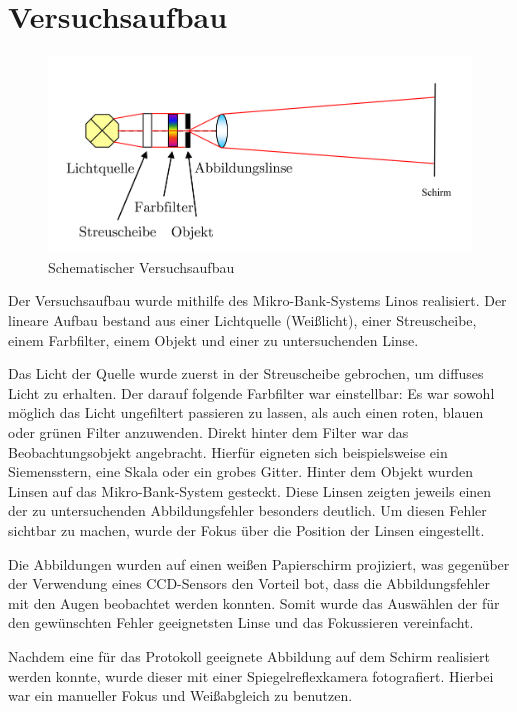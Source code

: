 \section{Versuchsaufbau}

\begin{figure}[h!]
	\includegraphics[width=\linewidth]{img/versuchsaufbau.png}
	\caption{Schematischer Versuchsaufbau}
	\label{fig:versuchsaufbau}
\end{figure}

Der Versuchsaufbau wurde mithilfe des Mikro-Bank-Systems Linos realisiert. Der lineare Aufbau bestand aus einer Lichtquelle (Weißlicht), einer Streuscheibe, einem Farbfilter, einem Objekt und einer zu untersuchenden Linse. 

Das Licht der Quelle wurde zuerst in der Streuscheibe gebrochen, um diffuses Licht zu erhalten. Der darauf folgende Farbfilter war einstellbar: Es war sowohl möglich das Licht ungefiltert passieren zu lassen, als auch einen roten, blauen oder grünen Filter anzuwenden. Direkt hinter dem Filter war das Beobachtungsobjekt angebracht. Hierfür eigneten sich beispielsweise ein Siemensstern, eine Skala oder ein grobes Gitter. Hinter dem Objekt wurden Linsen auf das Mikro-Bank-System gesteckt. Diese Linsen zeigten jeweils einen der zu untersuchenden Abbildungsfehler besonders deutlich. Um diesen Fehler sichtbar zu machen, wurde der Fokus über die Position der Linsen eingestellt. 

Die Abbildungen wurden auf einen weißen Papierschirm projiziert, was gegenüber der Verwendung eines CCD-Sensors den Vorteil bot, dass die Abbildungsfehler mit den Augen beobachtet werden konnten. Somit wurde das Auswählen der für den gewünschten Fehler geeignetsten Linse und das Fokussieren vereinfacht.

Nachdem eine für das Protokoll geeignete Abbildung auf dem Schirm realisiert werden konnte, wurde dieser mit einer Spiegelreflexkamera fotografiert. Hierbei war ein manueller Fokus und Weißabgleich zu benutzen.

